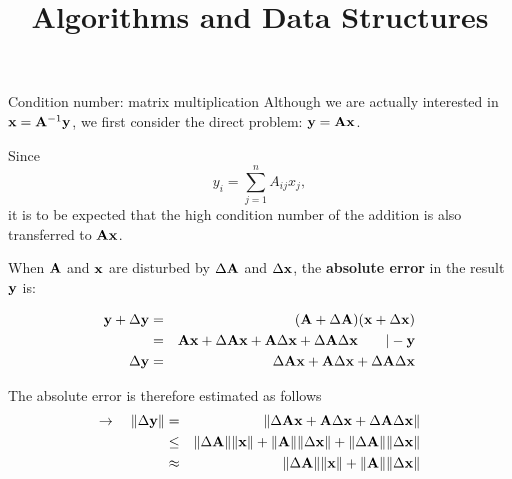 \documentclass[11pt,compress,t,notes=noshow, xcolor=table]{beamer}
\title{Algorithms and Data Structures}
\begin{document}


\begin{vbframe}{Condition number: matrix multiplication}
Although we are actually interested in $\mathbf{x} = \mathbf{A}^{-1}\mathbf{y}$, we first consider the direct problem: $\mathbf{y} = \mathbf{A} \mathbf{x}$.

\lz

Since
$$
y_i = \sum_{j = 1}^n A_{ij}x_j,
$$
it is to be expected that the high condition number of the addition is also transferred to $\mathbf{A} \mathbf{x}$.

\framebreak

When $\mathbf{A}$ and $\mathbf{x}$ are disturbed by $\Delta \mathbf{A}$ and $\Delta \mathbf{x}$, the \textbf{absolute error} in the result $\mathbf{y}$ is:

\begin{eqnarray*}
\mathbf{y} + \Delta \mathbf{y} &=& (\mathbf{A} + \Delta \mathbf{A})(
  \mathbf{x} + \Delta \mathbf{x})\\  &=& \mathbf{A} \mathbf{x} + \Delta \mathbf{A}\mathbf{x} + \mathbf{A}\Delta \mathbf{x} +
      \Delta \mathbf{A}\Delta \mathbf{x} \qquad | - \mathbf{y} \\
\Delta \mathbf{y} &=& \Delta \mathbf{A}\mathbf{x} + \mathbf{A}\Delta \mathbf{x} +
      \Delta \mathbf{A}\Delta \mathbf{x}
\end{eqnarray*}

The absolute error is therefore estimated as follows
\begin{eqnarray*}
\to \quad \|\Delta \mathbf{y}\| &=& \|\Delta \mathbf{A}\mathbf{x} + \mathbf{A}\Delta \mathbf{x} +
      \Delta \mathbf{A}\Delta \mathbf{x}\| \\ &\le& \|\Delta \mathbf{A}\|\|\mathbf{x}\| + \|\mathbf{A}\|\|\Delta \mathbf{x}\| +
      \|\Delta \mathbf{A}\|\|\Delta \mathbf{x}\| \\
      &\approx& \|\Delta \mathbf{A}\|\|\mathbf{x}\| + \|\mathbf{A}\|\|\Delta \mathbf{x}\|
\end{eqnarray*}

%


\end{vbframe}
\end{document}
